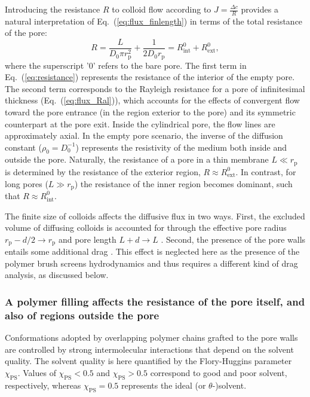 \documentclass[12pt, a4paper]{article}
\begin{document}
Introducing the resistance $R$ to colloid flow according to $J = \frac{\Delta c}{R}$ provides a natural interpretation of Eq.~(\ref{eq:flux_finlength}) in terms of the total resistance of the pore:
\begin{equation}
    R = \frac{L}{D_0 \pi r_{\text{p}}^{2}} + \frac{1}{2 D_0 r_{\text{p}}} = R_{\text{int}}^{0} + R_{\text{ext}}^{0},
    \label{eq:resistance}
\end{equation}
where the superscript '0' refers to the bare pore.
The first term in Eq.~(\ref{eq:resistance}) represents the resistance of the interior of the empty pore.
The second term corresponds to the Rayleigh resistance for a pore of infinitesimal thickness (Eq.~(\ref{eq:flux_Ral})), which accounts for the effects of convergent flow toward the pore entrance (in the region exterior to the pore) and its symmetric counterpart at the pore exit.
Inside the cylindrical pore, the flow lines are approximately axial.
In the empty pore scenario, the inverse of the diffusion constant ($\rho_0=D_0^{-1}$) represents the resistivity of the medium both inside and outside the pore.
Naturally,  the resistance of a pore in a thin membrane $L \ll r_{\text{p}}$ is determined by the resistance of the exterior region, $R \approx R_{\text{ext}}^{0}$.
In contrast, for long pores ($L \gg r_{\text{p}}$) the resistance of the inner region becomes dominant, such that $R \approx R_{\text{int}}^{0}$.

The finite size of colloids affects the diffusive flux in two ways.
First, the excluded volume of diffusing colloids is accounted for through the effective pore radius $r_{\text{p}} - d/2\rightarrow r_{\text{p}} $ and pore length $L + d \rightarrow L$ \cite{Renkin1954, Beck1970, Bungay1973, Anderson1974, Brenner1977}.
Second, the presence of the pore walls entails some additional drag \cite{Ladenburg1907, Faxen1922, Haberman1958}.
This effect is neglected here as the presence of the polymer brush screens hydrodynamics and thus requires a different kind of drag analysis, as discussed below.


\subsubsection{A polymer filling affects the resistance of the pore itself, and also of regions outside the pore}

Conformations adopted by overlapping polymer chains grafted to the pore walls are controlled by strong intermolecular interactions that depend on the solvent quality.
The solvent quality is here quantified by the Flory-Huggins parameter $\chi_{\text{PS}}$.
Values of $\chi_{\text{PS}}<0.5$ and $\chi_{\text{PS}}>0.5$ correspond to good and poor solvent, respectively, whereas $\chi_{\text{PS}}=0.5$ represents the ideal (or $\theta$-)solvent.
\end{document}
